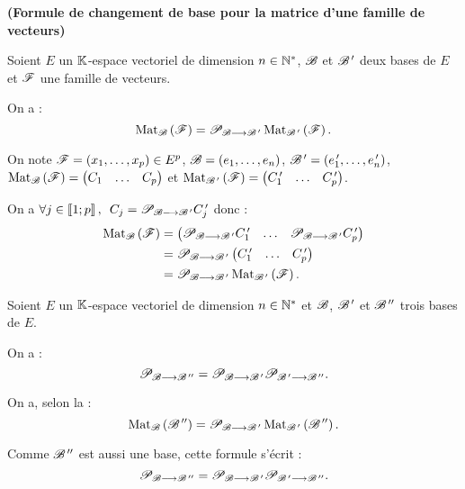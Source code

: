 \begin{prop}
{\normalfont\bfseries(Formule de changement de base pour la matrice d'une famille de vecteurs)}

Soient \(E\) un \(\mathbb{K}\)-espace vectoriel de dimension \(n\in\mathbb{N}^*\), \(\mathscr{B}\) et \(\mathscr{B}^{\,\prime}\) deux bases de \(E\) et \(\mathscr{F}\) une famille de vecteurs.

On a : \[\Mat{\fami{F}}=\pass{\fami{B}}{\fami{B}\prim}\Mat[\fami{B}\prim]{\fami{F}}.\]
\end{prop}

\begin{dem}
On note \(\mathscr{F}=\left(x_1,\dots,x_p\right)\in E^p\), \(\mathscr{B}=\left(e_1,\dots,e_n\right)\), \(\mathscr{B}^{\,\prime}=\left(e_1^{\,\prime},\dots,e_n^{\,\prime}\right)\), \(\Mat{\fami{F}}=\begin{pmatrix}C_1 & \dots & C_p\end{pmatrix}\) et \(\Mat[\fami{B}\prim]{\fami{F}}=\begin{pmatrix}C_1\prim & \dots & C_p\prim\end{pmatrix}\).

On a \(\quantifs{\forall j\in\interventierii{1}{p}}C_j=\pass{\fami{B}}{\fami{B}\prim}C_j\prim\) donc : \[\begin{aligned}
\Mat{\fami{F}}&=\begin{pmatrix}\pass{\fami{B}}{\fami{B}\prim}C_1\prim & \dots & \pass{\fami{B}}{\fami{B}\prim}C_p\prim\end{pmatrix} \\
&=\pass{\fami{B}}{\fami{B}\prim}\begin{pmatrix}C_1\prim & \dots & C_p\prim\end{pmatrix} \\
&=\pass{\fami{B}}{\fami{B}\prim}\Mat[\fami{B}\prim]{\fami{F}}.
\end{aligned}\]
\end{dem}

\begin{cor}
Soient \(E\) un \(\mathbb{K}\)-espace vectoriel de dimension \(n\in\mathbb{N}^*\) et \(\mathscr{B}\), \(\mathscr{B}^{\,\prime}\) et \(\mathscr{B}^{\,\prime\prime}\) trois bases de \(E\).

On a : \[\mathscr{P}_{\mathscr{B}\longrightarrow\mathscr{B}^{\,\prime\prime}}=\mathscr{P}_{\mathscr{B}\longrightarrow\mathscr{B}^{\,\prime}}\mathscr{P}_{\mathscr{B}^{\,\prime}\longrightarrow\mathscr{B}^{\,\prime\prime}}.\]
\end{cor}

\begin{dem}
On a, selon la  : \[\Mat{\fami{B}\seconde}=\pass{\fami{B}}{\fami{B}\prim}\Mat[\fami{B}\prim]{\fami{B}\seconde}.\]

Comme \(\mathscr{B}^{\,\prime\prime}\) est aussi une base, cette formule s'écrit : \[\mathscr{P}_{\mathscr{B}\longrightarrow\mathscr{B}^{\,\prime\prime}}=\mathscr{P}_{\mathscr{B}\longrightarrow\mathscr{B}^{\,\prime}}\mathscr{P}_{\mathscr{B}^{\,\prime}\longrightarrow\mathscr{B}^{\,\prime\prime}}.\]
\end{dem}

